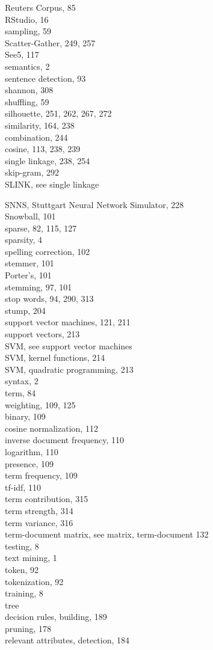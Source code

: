 \documentclass[10pt]{book}
\begin{document}
Reuters Corpus, 85\\
RStudio, 16\\
sampling, 59\\
Scatter-Gather, 249, 257\\
See5, 117\\
semantics, 2\\
sentence detection, 93\\
shannon, 308\\
shuffling, 59\\
silhouette, 251, 262, 267, 272\\
similarity, 164, 238\\
combination, 244\\
cosine, 113, 238, 239\\
single linkage, 238, 254\\
skip-gram, 292\\
SLINK, see single linkage

SNNS, Stuttgart Neural Network Simulator, 228\\
Snowball, 101\\
sparse, 82, 115, 127\\
sparsity, 4\\
spelling correction, 102\\
stemmer, 101\\
Porter's, 101\\
stemming, 97, 101\\
stop words, 94, 290, 313\\
stump, 204\\
support vector machines, 121, 211\\
support vectors, 213\\
SVM, see support vector machines\\
SVM, kernel functions, 214\\
SVM, quadratic programming, 213\\
syntax, 2\\
term, 84\\
weighting, 109, 125\\
binary, 109\\
cosine normalization, 112\\
inverse document frequency, 110\\
logarithm, 110\\
presence, 109\\
term frequency, 109\\
tf-idf, 110\\
term contribution, 315\\
term strength, 314\\
term variance, 316\\
term-document matrix, see matrix, term-document 132\\
testing, 8\\
text mining, 1\\
token, 92\\
tokenization, 92\\
training, 8\\
tree\\
decision rules, building, 189\\
pruning, 178\\
relevant attributes, detection, 184
\end{document}
